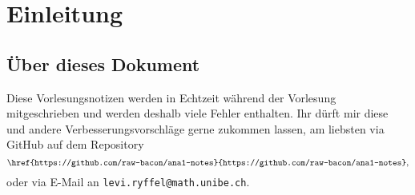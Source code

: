 \documentclass[../main.tex]{subfiles}
\begin{document}
\chapter*{Einleitung}
\section*{Über dieses Dokument}
Diese Vorlesungsnotizen werden in Echtzeit während der Vorlesung mitgeschrieben
und werden deshalb viele Fehler enthalten.
Ihr dürft mir diese und andere Verbesserungsvorschläge
gerne zukommen lassen, am liebsten via GitHub
auf dem Repository
\[
\texttt{\href{https://github.com/raw-bacon/ana1-notes}{https://github.com/raw-bacon/ana1-notes}},
\]
oder via E-Mail an \texttt{levi.ryffel@math.unibe.ch}.
\end{document}
